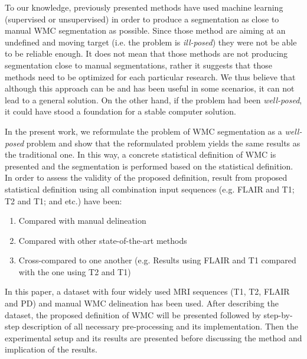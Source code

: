 To our knowledge, previously presented methods have used machine learning (supervised or unsupervised) in order to produce a segmentation as close to manual WMC segmentation as possible. Since those method are aiming at an undefined and moving target (i.e. the problem is \textit{ill-posed}) they were not be able to be reliable enough. It does not mean that those methods are not producing segmentation close to manual segmentations, rather it suggests that those methods need to be optimized for each particular research. We thus believe that although this approach can be and has been useful in some scenarios, it can not lead to a general solution. On the other hand, if the problem had been \textit{well-posed}, it could have stood a foundation for a stable computer solution.

In the present work, we reformulate the problem of WMC segmentation as a \textit{well-posed} problem and show that the reformulated problem yields the same results as the traditional one. In this way, a concrete statistical definition of WMC is presented and the segmentation is performed based on the statistical definition. In order to assess the validity of the proposed definition, result from proposed statistical definition using all combination input sequences (e.g. FLAIR and T1; T2 and T1; and etc.) have been:

\begin{enumerate}
\item Compared with manual delineation
\item Compared with other state-of-the-art methods
\item Cross-compared to one another (e.g. Results using FLAIR and T1 compared with the one using T2 and T1)
\end{enumerate}

In this paper, a dataset with four widely used MRI sequences (T1, T2, FLAIR and PD) and manual WMC delineation has been used. After describing the dataset, the proposed definition of WMC will be presented followed by step-by-step description of all necessary pre-processing and its implementation. Then the experimental setup and its results are presented before discussing the method and implication of the results.

  
  
  
  
  
  
  
  